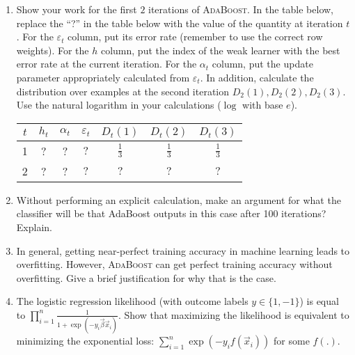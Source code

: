 \documentclass[11pt]{article}
\begin{document}
\begin{enumerate}[(1)]

\item Show your work for the first $2$ iterations of \textsc{AdaBoost}.
  In the table below, replace the ``?'' in the table below with the value of the
  quantity at iteration $t$.
  For the $\varepsilon_t$ column, put its error rate (remember to use the correct row weights).  
  For the $h$ column, put the index of the weak learner with the best error rate at the current iteration.
  For the $\alpha_t$ column, put the update parameter appropriately calculated from $\varepsilon_t$.
  In addition, calculate the distribution over examples at the second iteration $D_{2}(1), D_{2}(2), D_{2}(3)$.
  Use the natural logarithm in your calculations ($\log$ with base $e$).

\begin{tabular}{c|ccc|ccc}
$t$ & $h_t$ & $\alpha_t$ & $\varepsilon_t$ & $D_{t}(1)$ & $D_{t}(2)$ & $D_{t}(3)$ \\ \hline
1 & ? & ? & $ ? $ & $ \frac{1}{3} $ & $ \frac{1}{3} $ & $ \frac{1}{3} $ \\
2 & ? & ? & $ ? $ & $ ? $ & $ ? $ & $ ? $ \\
\end{tabular}

\item Without performing an explicit calculation, make an argument for what the classifier will be that AdaBoost outputs in this case after 100 iterations?  Explain.

\item In general, getting near-perfect training accuracy in machine learning leads to overfitting. However, \textsc{AdaBoost} can get perfect training accuracy without overfitting. Give a brief justification for why that is the case.
  
\item The logistic regression likelihood (with outcome labels $y \in \{ 1, -1 \}$) is equal to $\prod_{i=1}^{n} \frac{1}{1 + \exp(- y_i \vec{\beta} \vec{x}_i)}$.  Show that maximizing the likelihood is equivalent to minimizing the exponential loss: $\sum_{i=1}^n \exp(- y_i f(\vec{x}_i))$ for some $f(.)$.

\end{enumerate}


\end{document}
